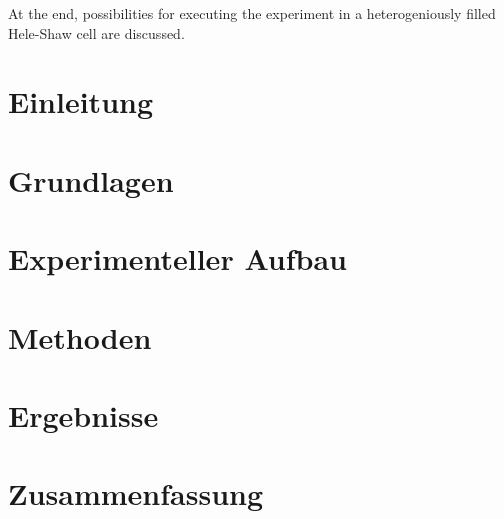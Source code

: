 \documentclass[twoside, a4paper, DIV=11,twocolumn]{book}
\begin{document}
  At the end, possibilities for executing the experiment in a heterogeniously filled Hele-Shaw cell are discussed.

\emptypage

\tableofcontents

\emptypage

\listoffigures

\newpage

\twocolumn
\balance %
\chapter{Einleitung}


\chapter{Grundlagen}


\chapter{Experimenteller Aufbau}


\chapter{Methoden}


\chapter{Ergebnisse}


% 

\chapter{Zusammenfassung}


\onecolumn



\end{document}
